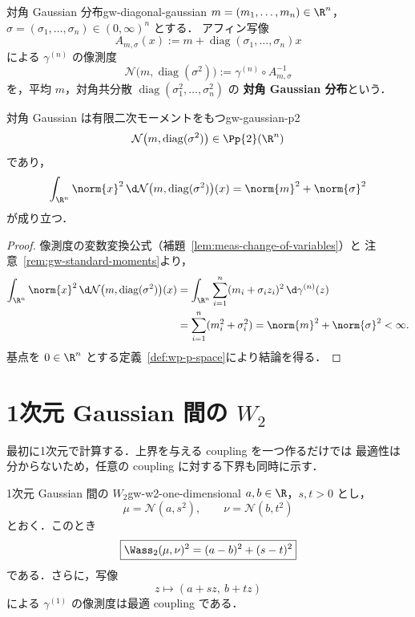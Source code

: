 \begin{definition}{対角 Gaussian 分布}{gw-diagonal-gaussian}
  $m=(m_1,\dots,m_n)\in\R^n$，
  $\sigma=(\sigma_1,\dots,\sigma_n)\in(0,\infty)^n$ とする．
  アフィン写像
  \[
    A_{m,\sigma}(x)
    :=m+\operatorname{diag}(\sigma_1,\dots,\sigma_n)x
  \]
  による $\gamma^{(n)}$ の像測度
  \[
    \mathcal{N}\bigl(m,\operatorname{diag}(\sigma^2)\bigr)
    :=\gamma^{(n)}\circ A_{m,\sigma}^{-1}
  \]
  を，平均 $m$，対角共分散
  $\operatorname{diag}(\sigma_1^2,\dots,\sigma_n^2)$ の
  \textbf{対角 Gaussian 分布}という．
\end{definition}

\begin{lemma}{対角 Gaussian は有限二次モーメントをもつ}{gw-gaussian-p2}
  \[
    \mathcal{N}\bigl(m,\operatorname{diag}(\sigma^2)\bigr)
    \in\Pp{2}(\R^n)
  \]
  であり，
  \[
    \int_{\R^n}\norm{x}^2\,
    \d\mathcal{N}\bigl(m,\operatorname{diag}(\sigma^2)\bigr)(x)
    =\norm{m}^2+\norm{\sigma}^2
  \]
  が成り立つ．
\end{lemma}

\begin{proof}
  像測度の変数変換公式（補題~\ref{lem:meas-change-of-variables}）と
  注意~\ref{rem:gw-standard-moments}より，
  \[
    \begin{aligned}
      \int_{\R^n}\norm{x}^2\,
      \d\mathcal{N}\bigl(m,\operatorname{diag}(\sigma^2)\bigr)(x)
      &=\int_{\R^n}\sum_{i=1}^n(m_i+\sigma_i z_i)^2
        \,\d\gamma^{(n)}(z)\\
      &=\sum_{i=1}^n(m_i^2+\sigma_i^2)
       =\norm{m}^2+\norm{\sigma}^2<\infty.
    \end{aligned}
  \]
  基点を $0\in\R^n$ とする定義~\ref{def:wp-p-space}により結論を得る．
\end{proof}

\section{1次元 Gaussian 間の \texorpdfstring{$W_2$}{W2}}
\label{sec:gw-one-dimensional}

最初に1次元で計算する．上界を与える coupling を一つ作るだけでは
最適性は分からないため，任意の coupling に対する下界も同時に示す．

\begin{theorem}{1次元 Gaussian 間の $W_2$}{gw-w2-one-dimensional}
  $a,b\in\R$，$s,t>0$ とし，
  \[
    \mu=\mathcal{N}(a,s^2),
    \qquad
    \nu=\mathcal{N}(b,t^2)
  \]
  とおく．このとき
  \[
    \boxed{
      \Wass_2(\mu,\nu)^2=(a-b)^2+(s-t)^2
    }
  \]
  である．さらに，写像
  \[
    z\longmapsto(a+sz,\ b+tz)
  \]
  による $\gamma^{(1)}$ の像測度は最適 coupling である．
\end{theorem}

